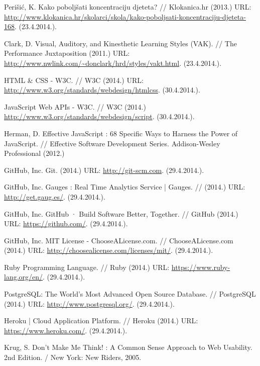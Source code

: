 \documentclass[11pt]{scrreprt}
\begin{document}
\begin{thebibliography}{99}

  \raggedright

   Perišić, K. Kako poboljšati koncentraciju djeteta? //
    Klokanica.hr (2013.) URL:
    \url{http://www.klokanica.hr/skolarci/skola/kako-poboljsati-koncentraciju-djeteta-168}.
    (23.4.2014.).

   Clark, D. Visual, Auditory, and Kinesthetic Learning Styles
    (VAK). // The Performance Juxtaposition (2011.) URL:
    \url{http://www.nwlink.com/~donclark/hrd/styles/vakt.html}. (23.4.2014.).

   HTML \& CSS - W3C. // W3C (2014.) URL:
    \url{http://www.w3.org/standards/webdesign/htmlcss}. (30.4.2014.).

   JavaScript Web APIs - W3C. // W3C (2014.)
    \url{http://www.w3.org/standards/webdesign/script}. (30.4.2014.).

   Herman, D. Effective JavaScript : 68 Specific Ways to
    Harness the Power of JavaScript. // Effective Software Development Series.
    Addison-Wesley Professional (2012.)

   GitHub, Inc. Git. (2014.) URL: \url{http://git-scm.com}.
    (29.4.2014.).

   GitHub, Inc. Gauges : Real Time Analytics Service | Gauges.
    // (2014.) URL: \url{http://get.gaug.es/}. (29.4.2014.).

   GitHub, Inc. GitHub · Build Software Better, Together. //
    GitHub (2014.) URL: \url{https://github.com/}. (29.4.2014.).

   GitHub, Inc. MIT License - ChooseALicense.com. //
    ChooseALicense.com (2014.) URL:
    \url{http://choosealicense.com/licenses/mit/}. (29.4.2014.).

   Ruby Programming Language. // Ruby (2014.) URL:
    \url{https://www.ruby-lang.org/en/}. (29.4.2014.).

   PostgreSQL: The World’s Most Advanced Open Source
    Database. // PostgreSQL (2014.) URL: \url{http://www.postgresql.org/}.
    (29.4.2014.).

   Heroku | Cloud Application Platform. // Heroku (2014.) URL:
    \url{https://www.heroku.com/}. (29.4.2014.).

   Krug, S. Don’t Make Me Think! : A Common Sense Approach to
    Web Usability. 2nd Edition. / New York: New Riders, 2005.


\end{thebibliography}
\end{document}
